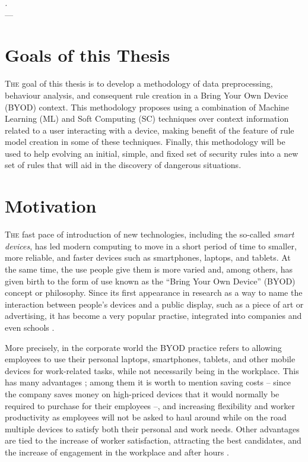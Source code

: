 \label{chap:introduction}
\begin{flushright}{\slshape
    .} \\ \medskip
    --- {}
\end{flushright}
\minitoc\mtcskip
\vfill



\section{Goals of this Thesis} %

\lettrine{T}{he} goal of this thesis is to develop a methodology of data preprocessing, behaviour analysis, and consequent rule creation in a Bring Your Own Device (BYOD) context. This methodology proposes using a combination of Machine Learning (ML) and Soft Computing (SC) techniques over context information related to a user interacting with a device, making benefit of the feature of rule model creation in some of these techniques. Finally, this methodology will be used to help evolving an initial, simple, and fixed set of security rules into a new set of rules that will aid in the discovery of dangerous situations.

\section{Motivation}
\label{sec:intro:byod}

\lettrine{T}{he} fast pace of introduction of new technologies, including the so-called \textit{smart devices}, has led modern computing to move in a short period of time to smaller, more reliable, and faster devices such as smartphones, laptops, and tablets. At the same time, the use people give them is more varied and, among others, has given birth to the form of use known as the ``Bring Your Own Device'' (BYOD) concept or philosophy. Since its first appearance in research \cite{ballagas2004byod} as a way to name the interaction between people's devices and a public display, such as a piece of art or advertising, it has become a very popular practise, integrated into companies \cite{thomson2012byod} and even schools \cite{song2014bring}.

More precisely, in the corporate world the BYOD practice refers to allowing employees to use their personal laptops, smartphones, tablets, and other mobile devices for work-related tasks, while not necessarily being in the workplace. This has many advantages \cite{singh2012byod}; among them it is worth to mention saving costs -- since the company saves money on high-priced devices that it would normally be required to purchase for their employees --, and increasing flexibility and worker productivity as employees will not be asked to haul around while on the road multiple devices to satisfy both their personal and work needs. Other advantages are tied to the increase of worker satisfaction, attracting the best candidates, and the increase of engagement in the workplace and after hours \cite{singh2012byod}.

